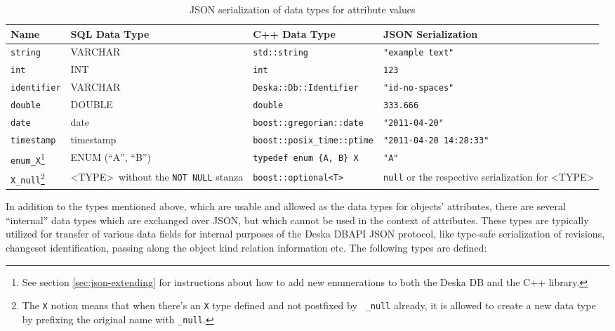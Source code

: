 \documentclass{article}
\begin{document}
\begin{longtable}{ p{18mm} | p{35mm} p{41mm} p{45mm} }
    \caption{JSON serialization of data types for attribute values} \\
    Name & SQL Data Type & C++ Data Type & JSON Serialization \\
    \hline
    \endhead
    {\tt string} & VARCHAR & {\tt std::string} & {\tt "example text"} \\
    {\tt int} & INT & {\tt int} & {\tt 123} \\
    {\tt identifier} & VARCHAR & {\tt Deska::Db::Identifier} & {\tt "id-no-spaces"} \\
    {\tt double} & DOUBLE & {\tt double} & {\tt 333.666} \\
    {\tt date} & date & {\tt boost::gregorian::date} & {\tt "2011-04-20"} \\
    {\tt timestamp} & timestamp & {\tt boost::posix\_time::ptime} & {\tt "2011-04-20 14:28:33"} \\
    {\tt enum\_X}\footnote{See section \ref{sec:json-extending} for instructions about how to add new enumerations to both
        the Deska DB and the C++ library.} & ENUM (``A'', ``B'') & {\tt typedef enum \{A, B\} X} & {\tt "A"} \\
    {\tt X\_null}\footnote{The {\tt X} notion means that when there's an {\tt X} type defined and not postfixed by {\tt
        \_null} already, it is allowed to create a new data type by prefixing the original name with {\tt \_null}.} &
        \textless TYPE\textgreater~without the {\tt NOT~NULL} stanza & {\tt boost::optional<T>} &
        {\tt null} or the respective serialization for \textless TYPE\textgreater \\
\end{longtable}

In addition to the types mentioned above, which are usable and allowed as the data types for objects' attributes, there
are several ``internal'' data types which are exchanged over JSON, but which cannot be used in the context of
attributes.  These types are typically utilized for transfer of various data fields for internal purposes of the Deska
DBAPI JSON protocol, like type-safe serialization of revisions, changeset identification, passing along the object kind
relation information etc.  The following types are defined:
\end{document}
